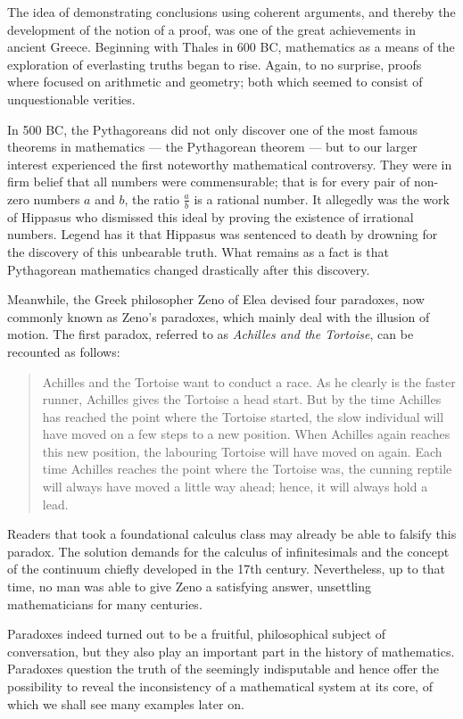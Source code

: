 \documentclass[hidelinks]{article}
\def\righttriangle{
\scalebox{0.7}{
\begin{picture}(5,0)
\hspace{-0.2em}
\put(0,0){\line(1,0){10}}
\put(10,0){\line(-1,1){10}}
\put(0,0){\line(0,1){10}}
\end{picture}
}
}
\begin{document}
The idea of demonstrating conclusions using coherent arguments, and thereby the development of the notion of a proof, was one of the great achievements in ancient Greece.
Beginning with Thales in 600 BC, mathematics as a means of the exploration of everlasting truths began to rise. Again, to no surprise, proofs where focused on arithmetic and geometry; both which seemed to consist of unquestionable verities.

In 500 BC, the Pythagoreans did not only discover one of the most famous theorems in mathematics --- the Pythagorean theorem\righttriangle --- but to our larger interest experienced the first noteworthy mathematical controversy. They were in firm belief that all numbers were commensurable; that is for every pair of non-zero numbers $a$ and $b$, the ratio $\frac{a}{b}$ is a rational number. It allegedly was the work of Hippasus who dismissed this ideal by proving the existence of irrational numbers. Legend has it that Hippasus was sentenced to death by drowning for the discovery of this unbearable truth. What remains as a fact is that Pythagorean mathematics changed drastically after this discovery.

Meanwhile, the Greek philosopher Zeno of Elea devised four paradoxes, now commonly known as Zeno's paradoxes, which mainly deal with the illusion of motion. The first paradox, referred to as \textit{Achilles and the Tortoise}, can be recounted as follows:
\begin{quote}\label{zeno_paradox}
Achilles and the Tortoise want to conduct a race. As he clearly is the faster runner, Achilles gives the Tortoise a head start. But by the time Achilles has reached the point where the Tortoise started, the slow individual will have moved on a few steps to a new position. When Achilles again reaches this new position, the labouring Tortoise will have moved on again. Each time Achilles reaches the point where the Tortoise was, the cunning reptile will always have moved a little way ahead; hence, it will always hold a lead.
\end{quote}
Readers that took a foundational calculus class may already be able to falsify this paradox. The solution demands for the calculus of infinitesimals and the concept of the continuum chiefly developed in the 17th century. Nevertheless, up to that time, no man was able to give Zeno a satisfying answer, unsettling mathematicians for many centuries.

Paradoxes indeed turned out to be a fruitful, philosophical subject of conversation, but they also play an important part in the history of mathematics. Paradoxes question the truth of the seemingly indisputable and hence offer the possibility to reveal the inconsistency of a mathematical system at its core, of which we shall see many examples later on.
\end{document}
